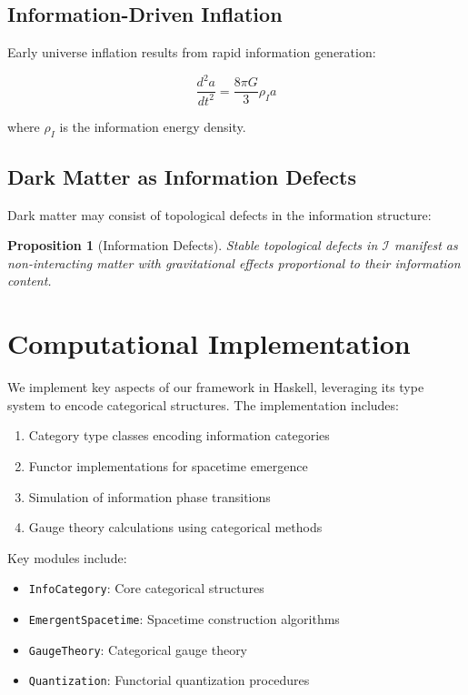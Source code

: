 \documentclass[12pt,a4paper]{article}
\newtheorem{proposition}[theorem]{Proposition}
\begin{document}
\subsection{Information-Driven Inflation}

Early universe inflation results from rapid information generation:

\begin{equation}
\frac{d^2a}{dt^2} = \frac{8\pi G}{3} \rho_I a
\end{equation}

where $\rho_I$ is the information energy density.

\subsection{Dark Matter as Information Defects}

Dark matter may consist of topological defects in the information structure:

\begin{proposition}[Information Defects]
Stable topological defects in $\mathcal{I}$ manifest as non-interacting matter with gravitational effects proportional to their information content.
\end{proposition}

\section{Computational Implementation}

We implement key aspects of our framework in Haskell, leveraging its type system to encode categorical structures. The implementation includes:

\begin{enumerate}
\item Category type classes encoding information categories
\item Functor implementations for spacetime emergence
\item Simulation of information phase transitions
\item Gauge theory calculations using categorical methods
\end{enumerate}

Key modules include:
\begin{itemize}
\item \texttt{InfoCategory}: Core categorical structures
\item \texttt{EmergentSpacetime}: Spacetime construction algorithms
\item \texttt{GaugeTheory}: Categorical gauge theory
\item \texttt{Quantization}: Functorial quantization procedures
\end{itemize}
\end{document}
